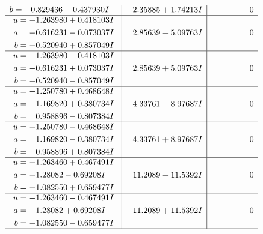 \documentclass[1p]{elsarticle_modified}
\theoremstyle{definition}
\begin{document}
$$\begin{array}{c|c|c}
\begin{aligned}
b &= -0.829436 - 0.437930 I\end{aligned}
 & -2.35885 + 1.74213 I & \phantom{-0.000000 } 0 \\ \hline\begin{aligned}
u &= -1.263980 + 0.418103 I \\
a &= -0.616231 - 0.073037 I \\
b &= -0.520940 + 0.857049 I\end{aligned}
 & \phantom{-}2.85639 - 5.09763 I & \phantom{-0.000000 } 0 \\ \hline\begin{aligned}
u &= -1.263980 - 0.418103 I \\
a &= -0.616231 + 0.073037 I \\
b &= -0.520940 - 0.857049 I\end{aligned}
 & \phantom{-}2.85639 + 5.09763 I & \phantom{-0.000000 } 0 \\ \hline\begin{aligned}
u &= -1.250780 + 0.468648 I \\
a &= \phantom{-}1.169820 + 0.380734 I \\
b &= \phantom{-}0.958896 - 0.807384 I\end{aligned}
 & \phantom{-}4.33761 - 8.97687 I & \phantom{-0.000000 } 0 \\ \hline\begin{aligned}
u &= -1.250780 - 0.468648 I \\
a &= \phantom{-}1.169820 - 0.380734 I \\
b &= \phantom{-}0.958896 + 0.807384 I\end{aligned}
 & \phantom{-}4.33761 + 8.97687 I & \phantom{-0.000000 } 0 \\ \hline\begin{aligned}
u &= -1.263460 + 0.467491 I \\
a &= -1.28082 - 0.69208 I \\
b &= -1.082550 + 0.659477 I\end{aligned}
 & \phantom{-}11.2089 - 11.5392 I & \phantom{-0.000000 } 0 \\ \hline\begin{aligned}
u &= -1.263460 - 0.467491 I \\
a &= -1.28082 + 0.69208 I \\
b &= -1.082550 - 0.659477 I\end{aligned}
 & \phantom{-}11.2089 + 11.5392 I & \phantom{-0.000000 } 0\\
 \hline 
 \end{array}$$\newpage$$\begin{array}{c|c|c}  

\end{array}$$
\end{document}
